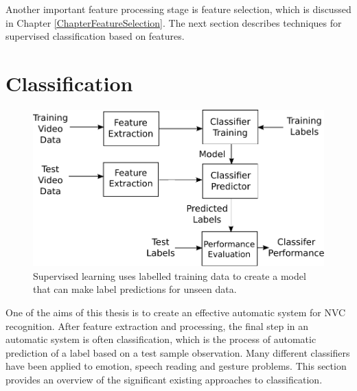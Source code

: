 
Another important feature processing stage is feature selection, which is discussed in Chapter \ref{ChapterFeatureSelection}. The next section describes techniques for supervised classification based on features.

\section{Classification}

\label{BackgroundSupervisedClassification}

\begin{figure}[tb]
\centering
\includegraphics[width = 0.6 \columnwidth]{nvcclass/supervisedSystem.pdf}
\caption{Supervised learning uses labelled training data to create a model that can make label predictions for unseen data.}
\label{FigureSupervisedClassification}
\end{figure}

One of the aims of this thesis is to create an effective automatic system for \ac{NVC} recognition. After feature extraction and processing, the final step in an automatic system is often classification, which is the process of automatic prediction of a label based on a test sample observation. Many different classifiers have been applied to emotion, speech reading and gesture problems. This section provides an overview of the significant existing approaches to classification.

